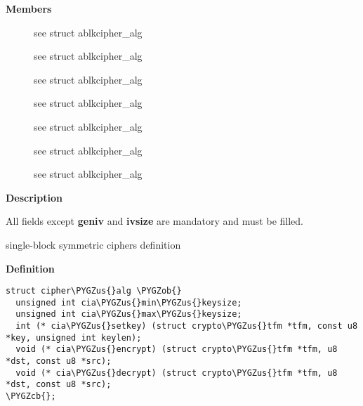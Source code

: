 \documentclass[a4paper,8pt,english]{sphinxmanual}
\def\PYGZus{\char`\_}
\def\PYGZob{\char`\{}
\def\PYGZcb{\char`\}}
\begin{document}
\textbf{Members}
\begin{description}
\item[{}] \leavevmode
see struct ablkcipher\_alg

\item[{}] \leavevmode
see struct ablkcipher\_alg

\item[{}] \leavevmode
see struct ablkcipher\_alg

\item[{}] \leavevmode
see struct ablkcipher\_alg

\item[{}] \leavevmode
see struct ablkcipher\_alg

\item[{}] \leavevmode
see struct ablkcipher\_alg

\item[{}] \leavevmode
see struct ablkcipher\_alg

\end{description}

\textbf{Description}

All fields except \textbf{geniv} and \textbf{ivsize} are mandatory and must be filled.

\begin{fulllineitems}
\label{crypto/api-skcipher:c.cipher_alg}
single-block symmetric ciphers definition

\end{fulllineitems}


\textbf{Definition}

\begin{Verbatim}[commandchars=\\\{\}]
struct cipher\PYGZus{}alg \PYGZob{}
  unsigned int cia\PYGZus{}min\PYGZus{}keysize;
  unsigned int cia\PYGZus{}max\PYGZus{}keysize;
  int (* cia\PYGZus{}setkey) (struct crypto\PYGZus{}tfm *tfm, const u8 *key, unsigned int keylen);
  void (* cia\PYGZus{}encrypt) (struct crypto\PYGZus{}tfm *tfm, u8 *dst, const u8 *src);
  void (* cia\PYGZus{}decrypt) (struct crypto\PYGZus{}tfm *tfm, u8 *dst, const u8 *src);
\PYGZcb{};
\end{Verbatim}
\end{document}
